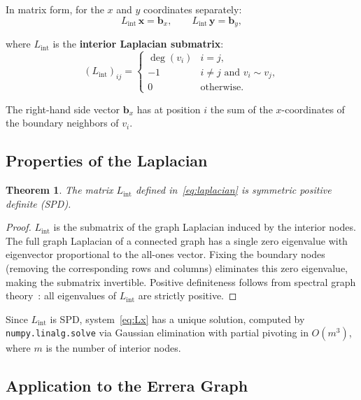 \documentclass[12pt,letterpaper]{article}
\theoremstyle{plain}
\newtheorem{theorem}{Theorem}[section]
\theoremstyle{definition}
\theoremstyle{remark}
\newcommand{\degr}{\operatorname{deg}}
\begin{document}
In matrix form, for the $x$ and $y$ coordinates separately:
\begin{equation}
    L_{\text{int}}\, \mathbf{x} = \mathbf{b}_x, \qquad
    L_{\text{int}}\, \mathbf{y} = \mathbf{b}_y,
    \label{eq:Lx}
\end{equation}

where $L_{\text{int}}$ is the \textbf{interior Laplacian submatrix}:
\begin{equation}
    (L_{\text{int}})_{ij} =
    \begin{cases}
        \degr(v_i) & i = j, \\
        -1         & i \neq j \text{ and } v_i \sim v_j, \\
        0          & \text{otherwise.}
    \end{cases}
    \label{eq:laplacian}
\end{equation}

The right-hand side vector $\mathbf{b}_x$ has at position $i$ the sum of the
$x$-coordinates of the boundary neighbors of $v_i$.

\subsection{Properties of the Laplacian}

\begin{theorem}
The matrix $L_{\text{int}}$ defined in~\eqref{eq:laplacian} is symmetric
positive definite (SPD).
\end{theorem}

\begin{proof}
$L_{\text{int}}$ is the submatrix of the graph Laplacian induced by the interior
nodes. The full graph Laplacian of a connected graph has a single zero eigenvalue
with eigenvector proportional to the all-ones vector. Fixing the boundary nodes
(removing the corresponding rows and columns) eliminates this zero eigenvalue,
making the submatrix invertible. Positive definiteness follows from spectral
graph theory~\cite{chung1997}: all eigenvalues of $L_{\text{int}}$ are strictly
positive.
\end{proof}

Since $L_{\text{int}}$ is SPD, system~\eqref{eq:Lx} has a unique solution, computed
by \texttt{numpy.linalg.solve} via Gaussian elimination with partial pivoting
in $O(m^3)$, where $m$ is the number of interior nodes.

\subsection{Application to the Errera Graph}
\end{document}
